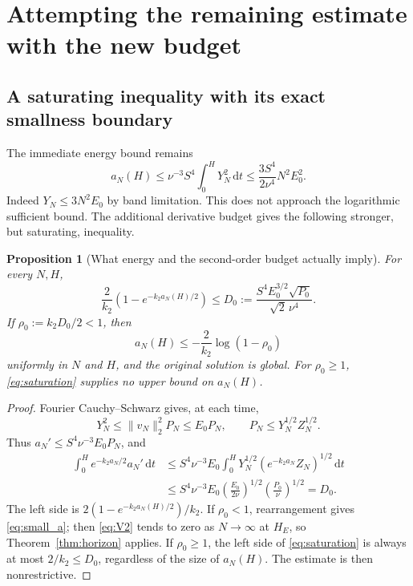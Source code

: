 \documentclass[11pt,a4paper]{article}
\newtheorem{proposition}[theorem]{Proposition}
\theoremstyle{definition}\newtheorem{definition}[theorem]{Definition}
\theoremstyle{remark}\newtheorem{remark}[theorem]{Remark}
\newcommand{\dd}{\,\mathrm d}
\newcommand{\norm}[1]{\lVert #1\rVert}
\numberwithin{equation}{section}
\begin{document}
\section{Attempting the remaining estimate with the new budget}
\label{sec:closure}
\subsection{A saturating inequality with its exact smallness boundary}
The immediate energy bound remains
\begin{equation}\label{eq:crude}
 a_N(H)\le\nu^{-3}S^4\int_0^H Y_N^2\dd t
 \le\frac{3S^4}{2\nu^4}N^2E_0^2.
\end{equation}
Indeed $Y_N\le3N^2E_0$ by band limitation. This does not approach the logarithmic sufficient bound. The additional derivative budget gives the following stronger, but saturating, inequality.

\begin{proposition}[What energy and the second-order budget actually imply]\label{prop:saturation}
For every $N,H$,
\begin{equation}\label{eq:saturation}
 \frac2{k_2}\left(1-e^{-k_2a_N(H)/2}\right)
 \le D_0:=\frac{S^4E_0^{3/2}\sqrt{P_0}}{\sqrt2\,\nu^4}.
\end{equation}
If $\rho_0:=k_2D_0/2<1$, then
\begin{equation}\label{eq:small_a}
 a_N(H)\le-\frac2{k_2}\log(1-\rho_0)
\end{equation}
uniformly in $N$ and $H$, and the original solution is global. For $\rho_0\ge1$, \eqref{eq:saturation} supplies no upper bound on $a_N(H)$.
\end{proposition}
\begin{proof}
Fourier Cauchy--Schwarz gives, at each time,
\[
 Y_N^2\le\norm{v_N}_2^2P_N\le E_0P_N,
 \qquad P_N\le Y_N^{1/2}Z_N^{1/2}.
\]
Thus $a_N'\le S^4\nu^{-3}E_0P_N$, and
\begin{align*}
 \int_0^H e^{-k_2a_N/2}a_N'\dd t
 &\le S^4\nu^{-3}E_0
   \int_0^H Y_N^{1/2}(e^{-k_2a_N}Z_N)^{1/2}\dd t\\
 &\le S^4\nu^{-3}E_0
   \left(\frac{E_0}{2\nu}\right)^{1/2}
   \left(\frac{P_0}{\nu}\right)^{1/2}=D_0.
\end{align*}
The left side is $2(1-e^{-k_2a_N(H)/2})/k_2$. If $\rho_0<1$, rearrangement gives \eqref{eq:small_a}; then \eqref{eq:V2} tends to zero as $N\to\infty$ at $H_E$, so Theorem~\ref{thm:horizon} applies. If $\rho_0\ge1$, the left side of \eqref{eq:saturation} is always at most $2/k_2\le D_0$, regardless of the size of $a_N(H)$. The estimate is then nonrestrictive.
\end{proof}
\end{document}
